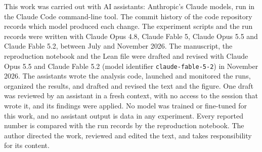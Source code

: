 This work was carried out with AI assistants: Anthropic's Claude models, run in the Claude Code
command-line tool. The commit history of the code repository records which model produced each
change. The experiment scripts and the run records were written with Claude Opus 4.8, Claude
Fable 5, Claude Opus 5.5 and Claude Fable 5.2, between July and November 2026. The manuscript,
the reproduction notebook and the Lean file were drafted and revised with Claude Opus 5.5 and
Claude Fable 5.2 (model identifier \texttt{claude-fable-5-2}) in November 2026. The assistants
wrote the analysis code, launched and monitored the runs, organized the results, and drafted and
revised the text and the figure. One draft was reviewed by an assistant in a fresh context, with
no access to the session that wrote it, and its findings were applied. No model was trained or
fine-tuned for this work, and no assistant output is data in any experiment. Every reported
number is compared with the run records by the reproduction notebook. The author directed the
work, reviewed and edited the text, and takes responsibility for its content.
